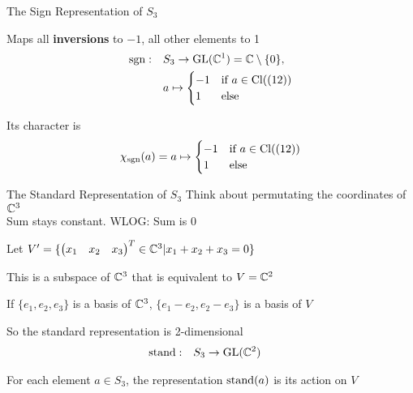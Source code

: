 \begin{frame}{The Sign Representation of $S_3$}
    \large
    
    Maps all \textbf{inversions} to $-1$, all other elements to 1
    \pause
    \begin{align*}
        \operatorname{sgn}: \quad & S_3 \to \operatorname{GL}(\mathbb{C}^1) = \mathbb{C} \setminus \{0\}, \\
        & a \mapsto \begin{cases}
            -1 & \text{if } a \in \operatorname{Cl}((12)) \\
            1 & \text{else}
        \end{cases}
    \end{align*}

    \pause
    Its character is
    \begin{align*}
        \chi_{\operatorname{sgn}}(a) = a \mapsto \begin{cases}
            -1 & \text{if } a \in \operatorname{Cl}((12)) \\
            1 & \text{else}
        \end{cases}
    \end{align*}
\end{frame}

\begin{frame}{The Standard Representation of $S_3$}
    \large
    Think about permutating the coordinates of $\mathbb{C}^3$ \pause \\
    Sum stays constant. \pause WLOG: Sum is 0 \pause

    Let $V' = \{\begin{pmatrix}
        x_1 & x_2 & x_3
    \end{pmatrix}^T \in \mathbb{C}^3 | x_1 + x_2 + x_3 = 0\}$
    
    \pause
    \vspace{1em}
    This is a subspace of $\mathbb{C}^3$ that is equivalent to $V = \mathbb{C}^2$

    \pause
    If $\{e_1, e_2, e_3\}$ is a basis of $\mathbb{C}^3$,
    $\{e_1 - e_2, e_2 - e_3\}$ is a basis of $V$
    
    \pause
    \vspace{1em}
    So the standard representation is 2-dimensional
    \begin{align*}
        \operatorname{stand}: \quad & S_3 \to \operatorname{GL}(\mathbb{C}^2)
    \end{align*}
    
    \pause
    For each element $a \in S_3$, the representation $\operatorname{stand}(a)$ is its action on $V$
\end{frame}

